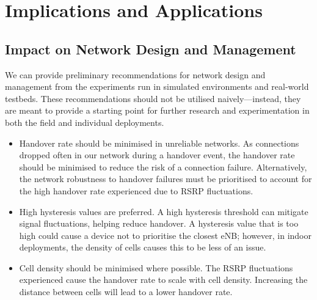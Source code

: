 \section{Implications and Applications}
\subsection{Impact on Network Design and Management}
We can provide preliminary recommendations for network design and management from the experiments run in simulated environments and real-world testbeds. These recommendations should not be utilised naively—instead, they are meant to provide a starting point for further research and experimentation in both the field and individual deployments.

\begin{itemize}
    \item Handover rate should be minimised in unreliable networks. As connections dropped often in our network during a handover event, the handover rate should be minimised to reduce the risk of a connection failure. Alternatively, the network robustness to handover failures must be prioritised to account for the high handover rate experienced due to RSRP fluctuations.
    \item High hysteresis values are preferred. A high hysteresis threshold can mitigate signal fluctuations, helping reduce handover. A hysteresis value that is too high could cause a device not to prioritise the closest eNB; however, in indoor deployments, the density of cells causes this to be less of an issue.
    \item Cell density should be minimised where possible. The RSRP fluctuations experienced cause the handover rate to scale with cell density. Increasing the distance between cells will lead to a lower handover rate.
\end{itemize}


